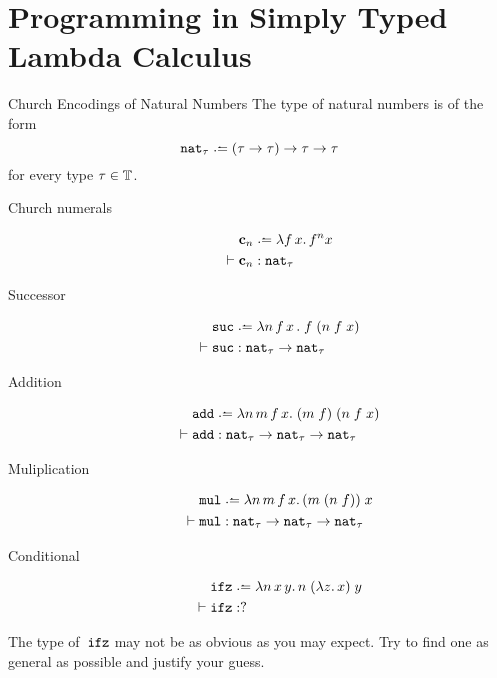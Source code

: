 \section{Programming in Simply Typed Lambda Calculus}
\begin{frame}[allowframebreaks]{Church Encodings of Natural Numbers}
The type of natural numbers is of the form
\[
  \nat_\tau \defeq (\tau \to \tau) \to \tau \to \tau
\]
for every type $\tau \in \mathbb{T}$.
  
  \begin{description}
    \item[Church numerals]
      \begin{align*}
        & \bc_n \defeq \lambda f\,x.\,
        f^n x \\
        \vdash{} & \bc_n : \nat_\tau
      \end{align*}
    \item[Successor]
      \begin{align*}
        & \suc \defeq \lambda n \,f\,x\,.\;f\;(n\;f\;x) \\
        \vdash{} & \suc : \nat_\tau \to \nat_\tau
      \end{align*}
    \item[Addition]
      \begin{align*}
        & \add \defeq \lambda n\,m\,f\,x.\; (m\;f)\;(n\;f\;x) \\
        \vdash{} & \add : \nat_\tau \to \nat_\tau \to \nat_\tau
      \end{align*}
    \item[Muliplication] 
      \begin{align*}
        & \mul \defeq \lambda n\,m\,f\,x.\, (m\;(n\;f))\;x\\
      \vdash{} & \mul : \nat_\tau \to \nat_\tau \to \nat_\tau
      \end{align*}
    \item[Conditional]
      \begin{align*}
        & \ifz \defeq \lambda n\,x\,y.\, n\;(\lambda z.\, x)\;y\\
        \vdash {} & \ifz : ?
      \end{align*}
  \end{description}
The type of~$\mathtt{ifz}$ may not be as obvious as you may expect.
Try to find one as general as possible and justify your guess.

\end{frame}
